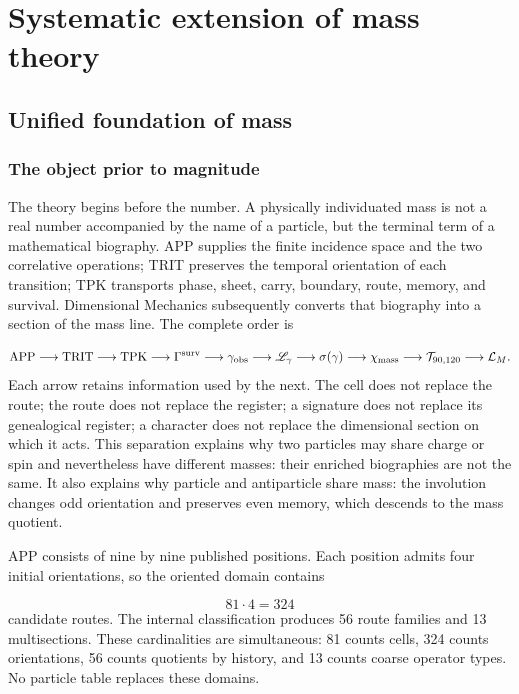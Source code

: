 \chapter{Systematic extension of mass theory}
\section{Unified foundation of mass}
\subsection{The object prior to magnitude}
The theory begins before the number. A physically individuated mass is not a real number accompanied by the name of a particle, but the terminal term of a mathematical biography. APP supplies the finite incidence space and the two correlative operations; TRIT preserves the temporal orientation of each transition; TPK transports phase, sheet, carry, boundary, route, memory, and survival. Dimensional Mechanics subsequently converts that biography into a section of the mass line. The complete order is

\[
\mathrm{APP}\longrightarrow\mathrm{TRIT}\longrightarrow\mathrm{TPK}
\longrightarrow\Gamma^{\rm surv}
\longrightarrow\gamma_{\rm obs}
\longrightarrow\mathscr L_\gamma
\longrightarrow\sigma(\gamma)
\longrightarrow\chi_{\rm mass}
\longrightarrow\mathcal T_{90,120}
\longrightarrow\mathcal L_M.
\]
Each arrow retains information used by the next. The cell does not replace the route; the route does not replace the register; a signature does not replace its genealogical register; a character does not replace the dimensional section on which it acts. This separation explains why two particles may share charge or spin and nevertheless have different masses: their enriched biographies are not the same. It also explains why particle and antiparticle share mass: the involution changes odd orientation and preserves even memory, which descends to the mass quotient.

APP consists of nine by nine published positions. Each position admits four initial orientations, so the oriented domain contains

\[
81\cdot4=324
\]
candidate routes. The internal classification produces 56 route families and 13 multisections. These cardinalities are simultaneous: 81 counts cells, 324 counts orientations, 56 counts quotients by history, and 13 counts coarse operator types. No particle table replaces these domains.

